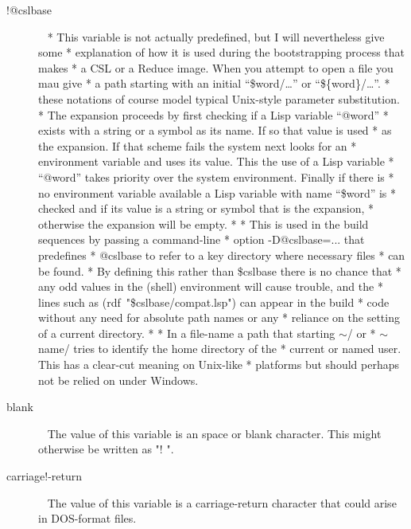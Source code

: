 \documentclass[a4paper,11pt]{article}
\begin{document}
\begin{description}
\item [{\ttfamily !@cslbase}]  ~\newline
  * This variable is not actually predefined, but I will nevertheless give some
  * explanation of how it is used during the bootstrapping process that makes
  * a CSL or a Reduce image. When you attempt to open a file you mau give
  * a path starting with an initial ``\$word/\ldots'' or ``\$\{word\}/\ldots''.
  * these notations of course model typical Unix-style parameter substitution.
  * The expansion proceeds by first checking if a Lisp variable ``@word''
  * exists with a string or a symbol as its name. If so that value is used
  * as the expansion. If that scheme fails the system next looks for an
  * environment variable and uses its value. This the use of a Lisp variable
  * ``@word'' takes priority over the system environment. Finally if there is
  * no environment variable available a Lisp variable with name ``\$word'' is
  * checked and if its value is a string or symbol that is the expansion,
  * otherwise the expansion will be empty.
  *
  * This is used in the build sequences by passing a command-line
  * option {\ttfamily -D@cslbase=...} that predefines
  * {\ttfamily @cslbase} to refer to a key directory where necessary files
  * can be found.
  * By defining this rather than {\ttfamily \$cslbase} there is no chance that
  * any odd values in the (shell) environment will cause trouble, and the
  * lines such as {\ttfamily (rdf~"\$cslbase/compat.lsp")} can appear in the build
  * code without any need for absolute path names or any
  * reliance on the setting of a current directory.
  *
  * In a file-name a path that starting {\ttfamily $\sim$/} or
  * {\ttfamily $\sim$name/} tries to identify the home directory of the
  * current or named user. This has a clear-cut meaning on Unix-like
  * platforms but should perhaps not be relied on under Windows.

\item [{\ttfamily blank}]  ~\newline
The value of this variable is an space or blank character. This
might otherwise be written as {\ttfamily "! "}.

\item [{\ttfamily carriage!-return}]  ~\newline
The value of this variable is a carriage-return character that could arise
in DOS-format files.


\end{description}
\end{document}

